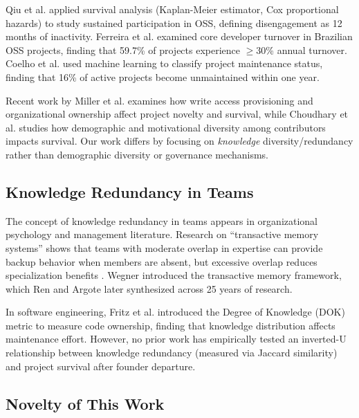 \documentclass[11pt,letterpaper]{article}
\begin{document}
Qiu et al. \cite{Qiu2019} applied survival analysis (Kaplan-Meier estimator, Cox proportional hazards) to study sustained participation in OSS, defining disengagement as 12 months of inactivity. Ferreira et al. \cite{Ferreira2020} examined core developer turnover in Brazilian OSS projects, finding that 59.7\% of projects experience $\geq$30\% annual turnover. Coelho et al. \cite{Coelho2020} used machine learning to classify project maintenance status, finding that 16\% of active projects become unmaintained within one year.

Recent work by Miller et al. \cite{Miller2025} examines how write access provisioning and organizational ownership affect project novelty and survival, while Choudhary et al. \cite{Choudhary2023} studies how demographic and motivational diversity among contributors impacts survival. Our work differs by focusing on \textit{knowledge} diversity/redundancy rather than demographic diversity or governance mechanisms.

\subsection{Knowledge Redundancy in Teams}

The concept of knowledge redundancy in teams appears in organizational psychology and management literature. Research on ``transactive memory systems'' shows that teams with moderate overlap in expertise can provide backup behavior when members are absent, but excessive overlap reduces specialization benefits \cite{Ren2011}. Wegner \cite{Wegner1985} introduced the transactive memory framework, which Ren and Argote \cite{Ren2011} later synthesized across 25 years of research.

In software engineering, Fritz et al. \cite{Fritz2010} introduced the Degree of Knowledge (DOK) metric to measure code ownership, finding that knowledge distribution affects maintenance effort. However, no prior work has empirically tested an inverted-U relationship between knowledge redundancy (measured via Jaccard similarity) and project survival after founder departure.

\subsection{Novelty of This Work}
\end{document}

